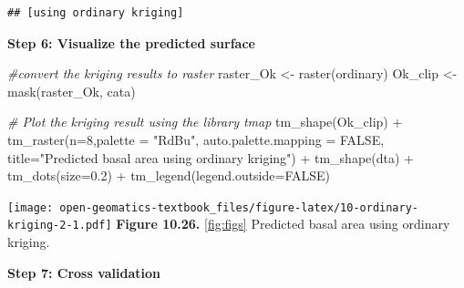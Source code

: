 \documentclass[
]{book}
\newenvironment{Shaded}{\begin{snugshade}}{\end{snugshade}}
\newcommand{\AttributeTok}[1]{\textcolor[rgb]{0.77,0.63,0.00}{#1}}
\newcommand{\CommentTok}[1]{\textcolor[rgb]{0.56,0.35,0.01}{\textit{#1}}}
\newcommand{\ConstantTok}[1]{\textcolor[rgb]{0.00,0.00,0.00}{#1}}
\newcommand{\DecValTok}[1]{\textcolor[rgb]{0.00,0.00,0.81}{#1}}
\newcommand{\DocumentationTok}[1]{\textcolor[rgb]{0.56,0.35,0.01}{\textbf{\textit{#1}}}}
\newcommand{\FloatTok}[1]{\textcolor[rgb]{0.00,0.00,0.81}{#1}}
\newcommand{\FunctionTok}[1]{\textcolor[rgb]{0.00,0.00,0.00}{#1}}
\newcommand{\NormalTok}[1]{#1}
\newcommand{\OtherTok}[1]{\textcolor[rgb]{0.56,0.35,0.01}{#1}}
\newcommand{\SpecialCharTok}[1]{\textcolor[rgb]{0.00,0.00,0.00}{#1}}
\newcommand{\StringTok}[1]{\textcolor[rgb]{0.31,0.60,0.02}{#1}}
\begin{document}
\begin{verbatim}
## [using ordinary kriging]
\end{verbatim}

\textbf{Step 6: Visualize the predicted surface}

\begin{Shaded}
\begin{Highlighting}[]
\CommentTok{\#convert the kriging results to raster}
\NormalTok{raster\_Ok      }\OtherTok{\textless{}{-}} \FunctionTok{raster}\NormalTok{(ordinary)}
\NormalTok{Ok\_clip    }\OtherTok{\textless{}{-}} \FunctionTok{mask}\NormalTok{(raster\_Ok, cata)}

\CommentTok{\# Plot the kriging result using the library tmap}
\FunctionTok{tm\_shape}\NormalTok{(Ok\_clip) }\SpecialCharTok{+} 
  \FunctionTok{tm\_raster}\NormalTok{(}\AttributeTok{n=}\DecValTok{8}\NormalTok{,}\AttributeTok{palette =} \StringTok{"RdBu"}\NormalTok{, }\AttributeTok{auto.palette.mapping =} \ConstantTok{FALSE}\NormalTok{,}
            \AttributeTok{title=}\StringTok{"Predicted basal area using ordinary kriging"}\NormalTok{) }\SpecialCharTok{+} 
  \FunctionTok{tm\_shape}\NormalTok{(dta) }\SpecialCharTok{+} \FunctionTok{tm\_dots}\NormalTok{(}\AttributeTok{size=}\FloatTok{0.2}\NormalTok{) }\SpecialCharTok{+}
  \FunctionTok{tm\_legend}\NormalTok{(}\AttributeTok{legend.outside=}\ConstantTok{FALSE}\NormalTok{)}
\end{Highlighting}
\end{Shaded}

\texttt{[image: open-geomatics-textbook\_files/figure-latex/10-ordinary-kriging-2-1.pdf]}
\textbf{Figure 10.26.} \ref{fig:figs} Predicted basal area using ordinary kriging.

\textbf{Step 7: Cross validation}

\begin{Shaded}
\end{Shaded}
\end{document}
